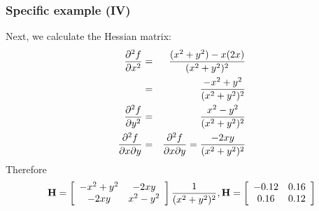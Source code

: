 \documentclass[hyperref={colorlinks=true}]{beamer}
\begin{document}

\begin{frame}%
  \frametitle{Specific example (IV)}

  Next, we calculate the Hessian matrix:
  \begin{eqnarray}
    \frac{\partial^2 f}{\partial x^2}  &=& \frac{(x^2 + y^2) - x(2x)}{(x^2 + y^2)^2} \\
                    &=& \frac{-x^2 + y^2}{(x^2 + y^2)^2} \\
    \frac{\partial^2 f}{\partial y^2}  &=& \frac{x^2 - y^2}{(x^2 + y^2)^2} \\
    \frac{\partial^2 f}{\partial x \partial y} &=& \frac{\partial^2 f}{\partial x \partial y} = \frac{-2xy}{(x^2 + y^2)^2}
  \end{eqnarray}
  Therefore
  \begin{equation}
    \mathbf {H}     = \left[\begin{array}{c c}
                             -x^2 + y^2 & -2xy \\
                             -2xy       & x^2 - y^2
                           \end{array}\right] \frac{1}{(x^2 + y^2)^2} , 
    \mathbf {H}     = \left[\begin{array}{c c}
                             -0.12 & 0.16 \\
                             0.16  & 0.12
                           \end{array}\right]                    
  \end{equation}

\end{frame}


\end{document}
